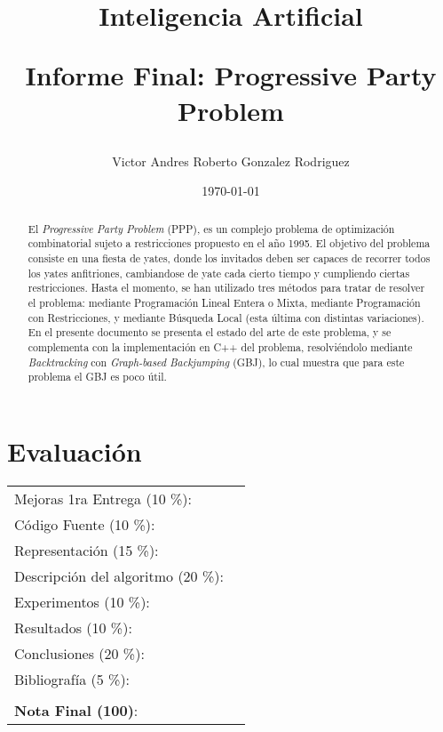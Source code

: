\documentclass[letter, 10pt]{article}
\begin{document}
\title{Inteligencia Artificial \\ \begin{Large}Informe Final: Progressive Party Problem\end{Large}}
\author{Victor Andres Roberto Gonzalez Rodriguez}
\date{\today}
\maketitle

\section*{Evaluaci\'on}

\begin{tabular}{ll}
Mejoras 1ra Entrega (10 \%): &  \underline{\hspace{2cm}}\\
C\'odigo Fuente (10 \%): &  \underline{\hspace{2cm}}\\
Representaci\'on (15 \%):  & \underline{\hspace{2cm}} \\
Descripci\'on del algoritmo (20 \%):  & \underline{\hspace{2cm}} \\
Experimentos (10 \%):  & \underline{\hspace{2cm}} \\
Resultados (10 \%):  & \underline{\hspace{2cm}} \\
Conclusiones (20 \%): &  \underline{\hspace{2cm}}\\
Bibliograf\'ia (5 \%): & \underline{\hspace{2cm}}\\
 &  \\
\textbf{Nota Final (100)}:   & \underline{\hspace{2cm}}
\end{tabular}

\begin{abstract}
El \textit{Progressive Party Problem} (PPP), es un complejo problema de optimización combinatorial sujeto a restricciones propuesto en el año 1995. El objetivo del problema consiste en una fiesta de yates, donde los invitados deben ser capaces de recorrer todos los yates anfitriones, cambiandose de yate cada cierto tiempo y cumpliendo ciertas restricciones. Hasta el momento, se han utilizado tres métodos para tratar de resolver el problema: mediante Programación Lineal Entera o Mixta, mediante Programación con Restricciones, y mediante Búsqueda Local (esta última con distintas variaciones). En el presente documento se presenta el estado del arte de este problema, y se complementa con la implementación en C++ del problema, resolviéndolo mediante \textit{Backtracking} con \textit{Graph-based Backjumping} (GBJ), lo cual muestra que para este problema el GBJ es poco útil.
\end{abstract}
\end{document}
